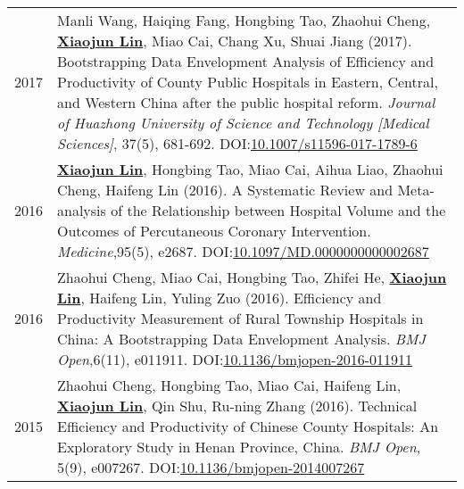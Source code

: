 \documentclass[a4paper,10pt]{article}
\begin{document}
\begin{longtable}{r p{13cm}}
2017 & Manli Wang, Haiqing Fang, Hongbing Tao, Zhaohui Cheng, \underline{\textbf{Xiaojun Lin}}, Miao Cai, Chang Xu, Shuai Jiang (2017). Bootstrapping Data Envelopment Analysis of Efficiency and Productivity of County Public Hospitals in Eastern, Central, and Western China after the public hospital reform. \emph{ Journal of Huazhong University of Science and Technology [Medical Sciences]}, 37(5), 681-692. DOI:\href{https://doi.org/10.1007/s11596-017-1789-6}{10.1007/s11596-017-1789-6}\\
2016 &  \underline{\textbf{Xiaojun Lin}}, Hongbing Tao, Miao Cai, Aihua Liao, Zhaohui Cheng, Haifeng Lin (2016). A Systematic Review and Meta-analysis of the Relationship between Hospital Volume and the Outcomes of Percutaneous Coronary Intervention.  \emph{ Medicine},95(5), e2687. DOI:\href{https://doi.org/10.1097/MD.0000000000002687}{10.1097/MD.0000000000002687}\\
2016 &  Zhaohui Cheng, Miao Cai, Hongbing Tao, Zhifei He, \underline{\textbf{Xiaojun Lin}}, Haifeng Lin, Yuling Zuo (2016). Efficiency and Productivity Measurement of Rural Township Hospitals in China: A Bootstrapping Data Envelopment Analysis. \emph{ BMJ Open},6(11), e011911. DOI:\href{https://doi.org/10.1136/bmjopen-2016-011911}{10.1136/bmjopen-2016-011911}\\
2015 & Zhaohui Cheng, Hongbing Tao, Miao Cai, Haifeng Lin, \underline{\textbf{Xiaojun Lin}}, Qin Shu, Ru-ning Zhang (2016). Technical Efficiency and Productivity of Chinese County Hospitals: An Exploratory Study in Henan Province, China. \emph{ BMJ Open}, 5(9), e007267. DOI:\href{https://doi.org/10.1136/bmjopen-2014007267}{10.1136/bmjopen-2014007267}\\ 
\end{longtable}
\end{document}
